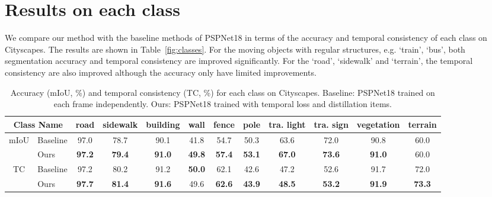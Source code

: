 \documentclass[runningheads]{llncs}
\begin{document}
\section{Results on each class}
We compare our method with the baseline methods of PSPNet18 in terms of the accuracy and temporal consistency of each class on Cityscapes. The results are shown in Table~\ref{fig:classes}. For the moving objects with regular structures, e.g. `train', `bus', both segmentation accuracy and temporal consistency are improved significantly. For the `road', `sidewalk' and `terrain', the temporal consistency are also improved although the accuracy only have limited improvements.
\begin{table}[htb]
\scriptsize
\vspace{-2em}
\caption{Accuracy (mIoU, \%) and temporal consistency  (TC, \%) for each class on Cityscapes. Baseline: PSPNet18 trained on each frame independently. Ours: PSPNet18 trained with temporal loss and distillation items.}
\begin{tabular}{l|l|c|c|c|c|c|c|c|c|c|c}
\toprule
\multicolumn{2}{c|}{Class Name}                                           & \multicolumn{1}{c|}{road}   & \multicolumn{1}{c|}{sidewalk} & building & wall   & fence  & pole   & tra. light & tra. sign & vegetation & terrain  \\\hline
\multicolumn{1}{c|}{\multirow{2}{*}{mIoU}} & \multicolumn{1}{c|}{Baseline} & \multicolumn{1}{c|}{97.0} & \multicolumn{1}{c|}{78.7}   & 90.1   & 41.8 & 54.7 & 50.3 & 63.6        & 72.0       & 90.8     & 60.0   \\
\multicolumn{1}{c|}{}                      & Ours                         & \textbf{97.2}                     & \textbf{79.4}                       & \textbf{91.0}   & \textbf{49.8} & \textbf{57.4} &\textbf{ 53.1} & \textbf{67.0}        & \textbf{73.6 }      & \textbf{91.0}     & 60.0  \\\hline
\multicolumn{1}{c|}{\multirow{2}{*}{TC}}                       & Baseline                     & 97.2                     & 80.2                       & 91.2   & \textbf{50.0} & 62.1 & 42.6 & 47.2        & 52.6       & 91.7     & 72.0  \\
                                          & Ours                         &\textbf{ 97.7}                     & \textbf{81.4}                       & \textbf{91.6}   & 49.6 & \textbf{62.6} & \textbf{43.9} & \textbf{48.5 }       & \textbf{53.2}       & \textbf{91.9}     & \textbf{73.3}  \\
                                          \hline


\end{tabular}
\end{table}
\end{document}
